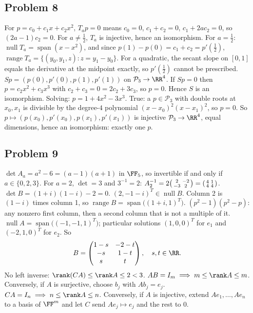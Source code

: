 \documentclass[11pt]{scrartcl}
\DeclareMathOperator{\nul}{null}
\DeclareMathOperator{\range}{range}
\DeclareMathOperator{\spn}{span}
\newcommand{\PP}{\mathcal P}
\begin{document}
\subsection*{Problem 8}
\begin{enumerate}[(a)]
  \ii For $p=c_0+c_1x+c_2x^2$, $T_ap=0$ means $c_0=0$, $c_1+c_2=0$, $c_1+2ac_2=0$, so $(2a-1)c_2=0$.
  For $a\ne\tfrac12$, $T_a$ is injective, hence an isomorphism.
  For $a=\tfrac12$: $\nul T_a=\spn(x-x^2)$, and since $p(1)-p(0)=c_1+c_2=p'(\tfrac12)$,
  $\range T_a=\{(y_0,y_1,z):z=y_1-y_0\}$.
  For a quadratic, the secant slope on $[0,1]$ equals the derivative at the midpoint exactly, so $p'(\tfrac12)$ cannot be prescribed.
  \ii $Sp=(p(0),p'(0),p(1),p'(1))$ on $\PP_3\to\RR^4$.
  If $Sp=0$ then $p=c_2x^2+c_3x^3$ with $c_2+c_3=0=2c_2+3c_3$, so $p=0$.
  Hence $S$ is an isomorphism.
  Solving: $p=1+4x^2-3x^3$.
  \ii True: a $p\in\PP_3$ with double roots at $x_0,x_1$ is divisible by the degree-$4$ polynomial $(x-x_0)^2(x-x_1)^2$, so $p=0$. So $p\mapsto(p(x_0),p'(x_0),p(x_1),p'(x_1))$ is injective $\PP_3\to\RR^4$, equal dimensions, hence an isomorphism: exactly one $p$.
\end{enumerate}

\subsection*{Problem 9}
\begin{enumerate}[(a)]
  \ii $\det A_a=a^2-6=(a-1)(a+1)$ in $\FF_5$, so invertible if and only if $a\in\{0,2,3\}$.
  For $a=2$, $\det=3$ and $3^{-1}=2$:
  $A_2^{-1}=2\begin{psmallmatrix}2&-2\\-3&2\end{psmallmatrix}=\begin{psmallmatrix}4&1\\4&4\end{psmallmatrix}$.
  \ii $\det B=(1+i)(1-i)-2=0$.
  $(2,-1-i)^T\in\nul B$.
  Column 2 is $(1-i)$ times column 1, so $\range B=\spn\big((1+i,1)^T\big)$.
  \ii $(p^2-1)(p^2-p)$: any nonzero first column, then a second column that is not a multiple of it.
  \ii $\nul A=\spn\big((-1,-1,1)^T\big)$; particular solutions $(1,0,0)^T$ for $e_1$ and $(-2,1,0)^T$ for $e_2$. So
  \[ B=\begin{pmatrix}1-s&-2-t\\-s&1-t\\s&t\end{pmatrix},\quad s,t\in\RR. \]
  No left inverse: $\rank(CA)\le\rank A\le2<3$.
  \ii $AB=I_m\implies m\le\rank A\le m$.
  Conversely, if $A$ is surjective, choose $b_j$ with $Ab_j=e_j$.
  $CA=I_n\implies n\le\rank A\le n$.
  Conversely, if $A$ is injective, extend $Ae_1,\dots,Ae_n$ to a basis of $\FF^m$ and let $C$ send $Ae_j\mapsto e_j$ and the rest to $0$.
\end{enumerate}
\end{document}

